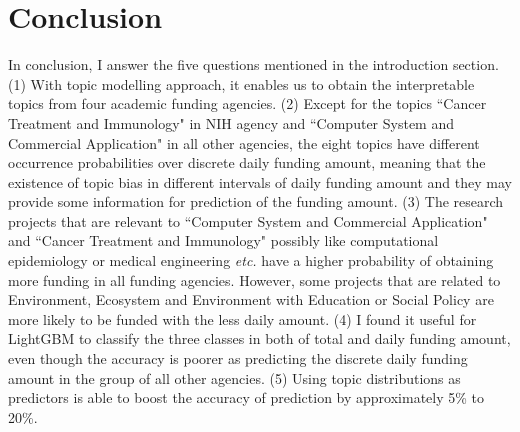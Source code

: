 \section{Conclusion}

In conclusion, I answer the five questions mentioned in the introduction section. (1) With topic modelling approach, it enables us to obtain the interpretable topics from four academic funding agencies. (2) Except for the topics ``Cancer Treatment and Immunology" in NIH agency and ``Computer System and Commercial Application" in all other agencies, the eight topics have different occurrence probabilities over discrete daily funding amount, meaning that the existence of topic bias in different intervals of daily funding amount and they may provide some information for prediction of the funding amount. (3) The research projects that are relevant to  ``Computer System and Commercial Application" and ``Cancer Treatment and Immunology" possibly like computational epidemiology or medical engineering \textit{etc.} have a higher probability of obtaining more funding in all funding agencies. However, some projects that are related to Environment, Ecosystem and Environment with Education or Social Policy are more likely to be funded with the less daily amount. (4) I found it useful for LightGBM to classify the three classes in both of total and daily funding amount, even though the accuracy is poorer as predicting the discrete daily funding amount in the group of all other agencies. (5) Using topic distributions as predictors is able to boost the accuracy of prediction by approximately 5\% to 20\%.

